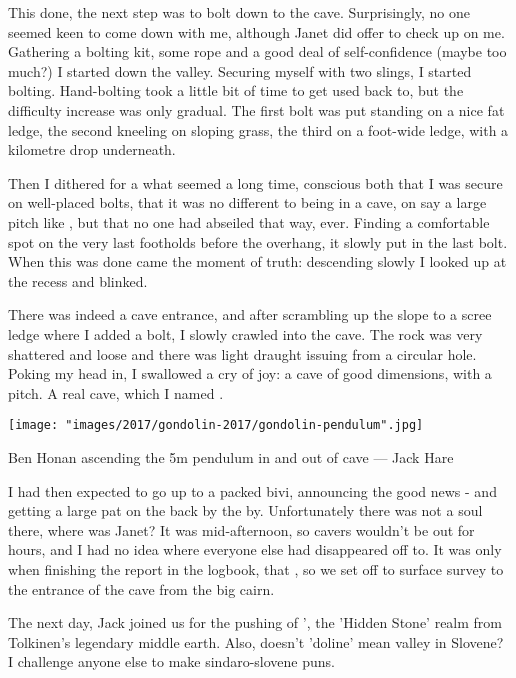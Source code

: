 This done, the next step was to bolt down to the cave. Surprisingly, no one seemed keen to come down with me, although Janet did offer to check up on me. Gathering a bolting kit, some rope and a good deal of self-confidence (maybe too much?) I started down the valley. Securing myself with two slings, I started bolting. Hand-bolting took a little bit of time to get used back to, but the difficulty increase was only gradual. The first bolt was put standing on a nice fat ledge, the second kneeling on sloping grass, the third on a foot-wide ledge, with a kilometre drop underneath.

Then I dithered for a what seemed a long time, conscious both that I was secure on well-placed bolts, that it was no different to being in a cave, on say a large pitch like , but that no one had abseiled that way, ever. Finding a comfortable spot on the very last footholds before the overhang, it slowly put in the last bolt. When this was done came the moment of truth: descending slowly I looked up at the recess and blinked.

There was indeed a cave entrance, and after scrambling up the slope to a scree ledge where I added a bolt, I slowly crawled into the cave. The rock was very shattered and loose and there was light draught issuing from a circular hole. Poking my head in, I swallowed a cry of joy: a cave of good dimensions, with a pitch. A real cave, which I named .

\begin{pagefigure}
\checkoddpage \ifoddpage \forcerectofloat \else \forceversofloat \fi
\centering
        \texttt{[image: "images/2017/gondolin-2017/gondolin-pendulum".jpg]}
     \label{gondolin pendulum}
    \caption{ Ben Honan ascending the 5m pendulum in and out of  cave --- Jack Hare }
\end{pagefigure}

I had then expected to go up to a packed bivi, announcing the good news - and getting a large pat on the back by the by. Unfortunately there was not a soul there, where was Janet? It was mid-afternoon, so cavers wouldn’t be out for hours, and I had no idea where everyone else had disappeared off to. It was only when finishing the report in the logbook, that , so we set off to surface survey to the entrance of the cave from the big cairn. 

The next day, Jack joined us for the pushing of ', the 'Hidden Stone' realm from Tolkinen's legendary middle earth. Also, doesn’t 'doline' mean valley in Slovene? I challenge anyone else to make sindaro-slovene puns. 

